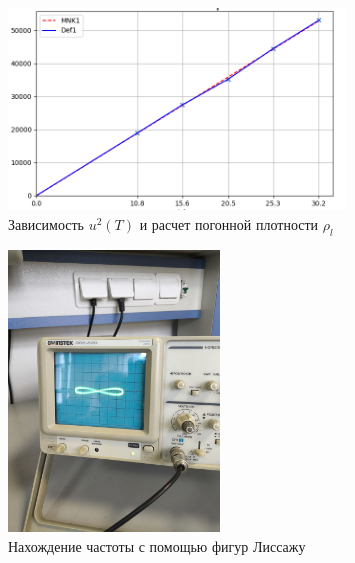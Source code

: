 \documentclass[a4paper]{article}
\begin{document}
\begin{figure}[t]
    \centering
    \includegraphics[width=0.8\textwidth]{pick4.png}
    \caption{Зависимость $u^2(T)$ и расчет погонной плотности $\rho_{l}$}
\end{figure}

\begin{figure}[t]
    \centering
    \includegraphics[width=0.5\textwidth]{pick5.jpg}
    \caption{Нахождение частоты с помощью фигур Лиссажу}
\end{figure}
\end{document}
